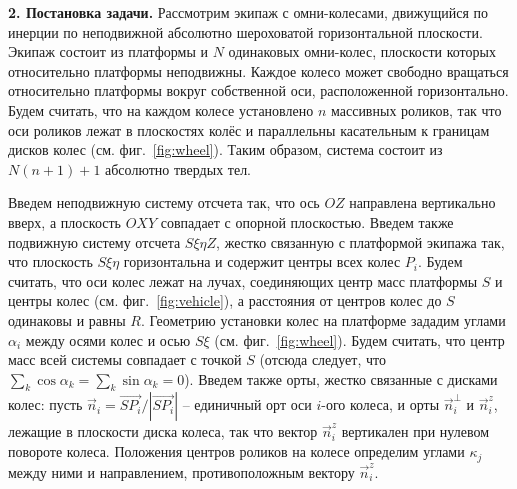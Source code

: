 {\bf 2. Постановка задачи.}
Рассмотрим экипаж с омни-колесами, движущийся по инерции по неподвижной абсолютно шероховатой горизонтальной плоскости. Экипаж состоит из платформы и $N$ одинаковых омни-колес, плоскости которых относительно платформы неподвижны. Каждое колесо может свободно вращаться относительно платформы вокруг собственной оси, расположенной горизонтально. Будем считать, что на каждом колесе установлено $n$ массивных роликов, так что оси роликов лежат в плоскостях колёс и параллельны касательным к границам дисков колес (см. фиг.~\ref{fig:wheel}). Таким образом, система состоит из $N(n+1) + 1$ абсолютно твердых тел. 



Введем неподвижную систему отсчета так, что ось $OZ$ направлена вертикально вверх, а плоскость $OXY$ совпадает с опорной плоскостью.
Введем также подвижную систему отсчета $S\xi\eta Z$, жестко связанную с платформой экипажа так, что плоскость $S\xi\eta$ горизонтальна и содержит центры всех колес $P_i$. Будем считать, что оси колес лежат на лучах, соединяющих центр масс платформы $S$ и центры колес (см. фиг.~\ref{fig:vehicle}), а расстояния от центров колес до $S$ одинаковы и равны $R$. Геометрию установки колес на платформе зададим углами $\alpha_i$ между осями колес и осью $S\xi$
(см. фиг.~\ref{fig:wheel}). Будем считать, что центр масс всей системы совпадает с точкой $S$ (отсюда следует, что $\sum_k \cos\alpha_k = \sum_k\sin\alpha_k = 0$). Введем также орты, жестко связанные с дисками колес: пусть $\vec{n}_i = \vec{SP_i}/|\vec{SP_i}|$ -- единичный орт оси $i$-ого колеса, и орты $\vec{n}_i^\perp$ и $\vec{n}_i^z$, лежащие в плоскости диска колеса, так что вектор $\vec{n}_i^z$ вертикален при нулевом повороте колеса. Положения центров роликов на колесе определим углами $\kappa_j$ между ними и направлением, противоположным вектору $\vec{n}_i^z$. 

